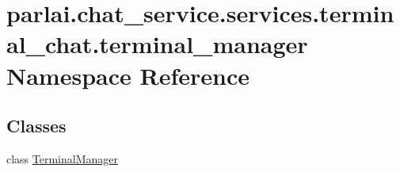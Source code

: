 \hypertarget{namespaceparlai_1_1chat__service_1_1services_1_1terminal__chat_1_1terminal__manager}{}\section{parlai.\+chat\+\_\+service.\+services.\+terminal\+\_\+chat.\+terminal\+\_\+manager Namespace Reference}
\label{namespaceparlai_1_1chat__service_1_1services_1_1terminal__chat_1_1terminal__manager}
\subsection*{Classes}
\begin{DoxyCompactItemize}
\item 
class \hyperlink{classparlai_1_1chat__service_1_1services_1_1terminal__chat_1_1terminal__manager_1_1TerminalManager}{Terminal\+Manager}
\end{DoxyCompactItemize}
